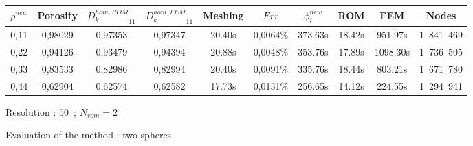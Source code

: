\begin{figure}[H]%
%
\begin{center}
\begin{tabular}{|c|c||c|c||c|c||c|c||c||c|}
\hline
\rowcolor{lightgray} $\rho^{new}$&Porosity&${D_k^{hom,ROM}}_{11}$&${D_k^{hom,FEM}}_{11}$&Meshing&$Err$&$\phi_i^{new}$&ROM&FEM&Nodes\\
\hline
0,11&0,98029&0,97353&0,97347&20.40s&0,0064\%&373.63s&18.42s&951.97s&1\ 841\ 469\\
\hline
0,22&0,94126&0,93479&0,94394&20.88s&0,0048\%&353.76s&17.89s&1098.30s&1\ 736\ 505\\
\hline
0,33&0,83533&0,82986&0,82994&20.40s&0,0091\%&335.76s&18.44s&803.21s&1\ 671\ 780\\
\hline
0,44&0,62904&0,62574&0,62582&17.73s&0,0131\%&256.65s&14.12s&224.55s&1\ 294\ 941\\
\hline
\end{tabular}
\end{center}
\caption{Resolution : $50$\ ; $N_{rom}=2$}
%
\end{figure}

\ligneinter
\begin{figure}[H]%
%
\begin{table}[H]
\begin{center}
%
%
\qquad
{}%
%
\end{center}
\end{table}
%
\caption{Evaluation of the method : two spheres}
\end{figure}

